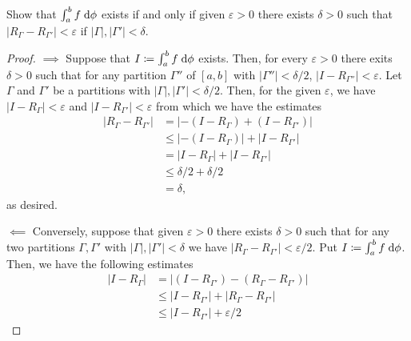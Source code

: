\begin{problem}
Show that $\int_a^bf\;\mathrm{d}\phi$ exists if and only if given $\varepsilon>0$
there exists $\delta>0$ such that
$\left|R_\Gamma-R_{\Gamma'}\right|<\varepsilon$ if
$|\Gamma|,|\Gamma'|<\delta$.
\end{problem}
\begin{proof}
$\implies$ Suppose that $I\coloneqq \int_a^bf\;\mathrm{d}\phi$ exists. Then, for
every $\varepsilon>0$ there exits $\delta>0$ such that for any partition
$\Gamma''$ of $[a,b]$ with $|\Gamma''|<\delta/2$,
$|I-R_{\Gamma''}|<\varepsilon$. Let $\Gamma$ and $\Gamma'$ be a partitions
with $|\Gamma|,|\Gamma'|<\delta/2$. Then, for the given $\varepsilon$, we
have $|I-R_\Gamma|<\varepsilon$ and $|I-R_{\Gamma'}|<\varepsilon$ from
which we have the estimates
\begin{align*}
|R_\Gamma-R_{\Gamma'}|
&=\left|-(I-R_\Gamma)+(I-R_{\Gamma'})\right|\\
&\leq\left|-(I-R_\Gamma)\right|+\left|I-R_{\Gamma'}\right|\\
&=\left|I-R_\Gamma\right|+\left|I-R_{\Gamma'}\right|\\
&\leq\delta/2+\delta/2\\
&=\delta,
\end{align*}
as desired.

$\impliedby$ Conversely, suppose that given $\varepsilon>0$ there exists
$\delta>0$ such that for any two partitions $\Gamma,\Gamma'$ with
$|\Gamma|,|\Gamma'|<\delta$ we have
$|R_\Gamma-R_{\Gamma'}|<\varepsilon/2$. Put $I\coloneqq\int_a^b
f\;\mathrm{d}\phi$. Then, we have the following estimates
\begin{align*}
|I-R_\Gamma|
&=\left|(I-R_{\Gamma'})-(R_{\Gamma}-R_{\Gamma'})\right|\\
&\leq\left|I-R_{\Gamma'}\right|+\left|R_{\Gamma}-R_{\Gamma'}\right|\\
&\leq\left|I-R_{\Gamma'}\right|+\varepsilon/2
\end{align*}
\end{proof}
\newpage

